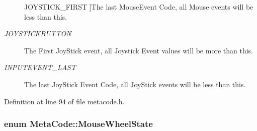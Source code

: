 \begin{Desc}
\begin{description}
{{JOYSTICK\_\-FIRST}
\label{d7/d72/classMetaCode_a7390e6f58e25c0ce377bba4e63081b24aa3222db6ab303f525a1a0c87603d806c}
}]The last MouseEvent Code, all Mouse events will be less than this. \item[{\em 
\hypertarget{classMetaCode_a7390e6f58e25c0ce377bba4e63081b24ab52ae2c161faf882271ec71ded86501f}{
JOYSTICKBUTTON}
\label{d7/d72/classMetaCode_a7390e6f58e25c0ce377bba4e63081b24ab52ae2c161faf882271ec71ded86501f}
}]The First JoyStick event, all Joystick Event values will be more than this. \item[{\em 
\hypertarget{classMetaCode_a7390e6f58e25c0ce377bba4e63081b24ad1ca5de26bcaae04a631fdaa13e5749f}{
INPUTEVENT\_\-LAST}
\label{d7/d72/classMetaCode_a7390e6f58e25c0ce377bba4e63081b24ad1ca5de26bcaae04a631fdaa13e5749f}
}]The last JoyStick Event Code, all JoyStick events will be less than this. \end{description}
\end{Desc}



Definition at line 94 of file metacode.h.\hypertarget{classMetaCode_a31155465656363d4ecdf9ce7ae5d7227}{
\subsubsection[{MouseWheelState}]{\setlength{\rightskip}{0pt plus 5cm}enum {\bf MetaCode::MouseWheelState}}}
\label{d7/d72/classMetaCode_a31155465656363d4ecdf9ce7ae5d7227}


